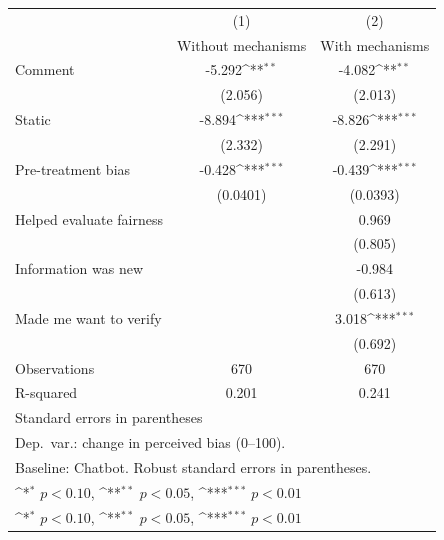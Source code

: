 {
\def\sym#1{\ifmmode^{#1}\else\(^{#1}\)\fi}
\begin{tabular}{l*{2}{c}}
\toprule
                    &\multicolumn{1}{c}{(1)}&\multicolumn{1}{c}{(2)}\\
                    &\multicolumn{1}{c}{Without mechanisms}&\multicolumn{1}{c}{With mechanisms}\\
\midrule
Comment             &      -5.292\sym{**} &      -4.082\sym{**} \\
                    &     (2.056)         &     (2.013)         \\
\addlinespace
Static              &      -8.894\sym{***}&      -8.826\sym{***}\\
                    &     (2.332)         &     (2.291)         \\
\addlinespace
Pre-treatment bias  &      -0.428\sym{***}&      -0.439\sym{***}\\
                    &    (0.0401)         &    (0.0393)         \\
\addlinespace
Helped evaluate fairness&                     &       0.969         \\
                    &                     &     (0.805)         \\
\addlinespace
Information was new &                     &      -0.984         \\
                    &                     &     (0.613)         \\
\addlinespace
Made me want to verify&                     &       3.018\sym{***}\\
                    &                     &     (0.692)         \\
\midrule
Observations        &         670         &         670         \\
R-squared           &       0.201         &       0.241         \\
\bottomrule
\multicolumn{3}{l}{\footnotesize Standard errors in parentheses}\\
\multicolumn{3}{l}{\footnotesize Dep.\ var.: change in perceived bias (0--100).}\\
\multicolumn{3}{l}{\footnotesize Baseline: Chatbot. Robust standard errors in parentheses.}\\
\multicolumn{3}{l}{\footnotesize \sym{*} \(p<0.10\), \sym{**} \(p<0.05\), \sym{***} \(p<0.01\)}\\
\multicolumn{3}{l}{\footnotesize \sym{*} \(p<0.10\), \sym{**} \(p<0.05\), \sym{***} \(p<0.01\)}\\
\end{tabular}
}
